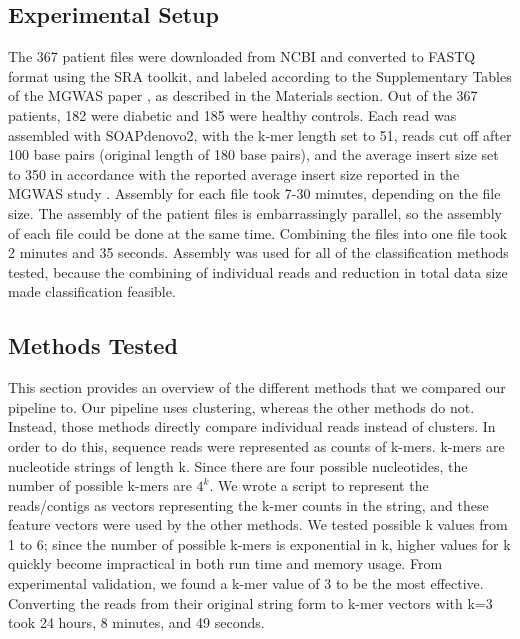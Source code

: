 
\subsection{Experimental Setup}

The 367 patient files were downloaded from NCBI and converted to FASTQ format using the SRA toolkit, and labeled according to the Supplementary Tables of the MGWAS paper \cite{qin041012}, as described in the Materials section. Out of the 367 patients, 182 were diabetic and 185 were healthy controls. Each read was assembled with SOAPdenovo2, with the k-mer length set to 51, reads cut off after 100 base pairs (original length of 180 base pairs), and the average insert size set to 350 in accordance with the reported average insert size reported in the MGWAS study \cite{qin041012}. Assembly for each file took 7-30 minutes, depending on the file size. The assembly of the patient files is embarrassingly parallel, so the assembly of each file could be done at the same time. Combining the files into one file took 2 minutes and 35 seconds. Assembly was used for all of the classification methods tested, because the combining of individual reads and reduction in total data size made classification feasible.

\subsection{Methods Tested}

This section provides an overview of the different methods that we compared our pipeline to. Our pipeline uses clustering, whereas the other methods do not. Instead, those methods directly compare individual reads instead of clusters. In order to do this, sequence reads were represented as counts of k-mers. k-mers are nucleotide strings of 
length k. Since there are four possible nucleotides, the number
of possible k-mers are \(4^k\). 
We wrote a script to represent the reads/contigs as vectors representing the k-mer counts in the string, and these feature 
vectors were used by the other methods. We tested possible k values 
from 1 to 6; since the number of possible k-mers is 
exponential in k, higher values for k quickly become impractical in both run time and memory usage. From experimental validation, we found a k-mer value of 3 to be the most effective. Converting the reads from their original string form to k-mer vectors with k=3 took 24 hours, 8 minutes, and 49 seconds.

